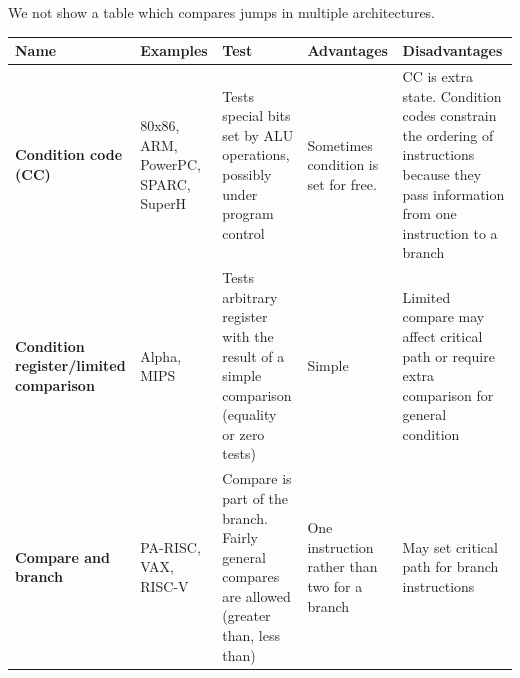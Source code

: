 \documentclass[a4paper,11pt]{article}
\begin{document}
We not show a table which compares jumps in multiple architectures.
\begin{table}[H]
	\center {}
	\begin{tabular}{p{} p{} p{} p{} p{}}
		\hline
		\textbf{Name}       &
		\textbf{Examples}   &
		\textbf{Test}       &
		\textbf{Advantages} &
		\textbf{Disadvantages} \\
		\hline

		\textbf{Condition code (CC)}
		                    &
		80x86, ARM, PowerPC, SPARC, SuperH
		                    &
		Tests special bits set by ALU operations, possibly under program control
		                    &
		Sometimes condition is set for free.
		                    &
		CC is extra state. Condition codes constrain the ordering of instructions because they pass information from one instruction to a branch
		\\[1.5em]
		\hline

		\textbf{Condition register/limited comparison}
		                    &
		Alpha, MIPS
		                    &
		Tests arbitrary register with the result of a simple comparison (equality or zero tests)
		                    &
		Simple
		                    &
		Limited compare may affect critical path or require extra comparison for general condition
		\\[1.5em]
		\hline

		\textbf{Compare and branch}
		                    &
		PA-RISC, VAX, RISC-V
		                    &
		Compare is part of the branch. Fairly general compares are allowed (greater than, less than)
		                    &
		One instruction rather than two for a branch
		                    &
		May set critical path for branch instructions
		\\

		\hline
	\end{tabular}
\end{table}
\end{document}
